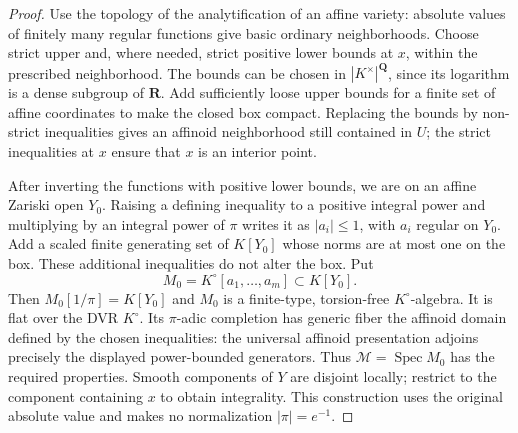 \documentclass[11pt,a4paper]{article}
\numberwithin{equation}{section}
\theoremstyle{definition}
\theoremstyle{remark}
\begin{document}
\begin{proof}
Use the topology of the analytification of an affine variety:
absolute values of finitely many regular functions give basic
ordinary neighborhoods. Choose strict upper and, where needed,
strict positive lower bounds at $x$, within the prescribed
neighborhood. The bounds can be chosen in
$|K^\times|^{\mathbf Q}$, since its logarithm is a dense
subgroup of $\mathbf R$. Add sufficiently loose upper bounds
for a finite set of affine coordinates to make the closed box
compact. Replacing the bounds by non-strict inequalities gives
an affinoid neighborhood still contained in $U$; the strict
inequalities at $x$ ensure that $x$ is an interior point.

After inverting the functions with positive lower bounds,
we are on an affine Zariski open $Y_0$. Raising a defining
inequality to a positive integral power and multiplying by
an integral power of $\pi$ writes it as $|a_i|\leq1$, with
$a_i$ regular on $Y_0$. Add a scaled finite generating set
of $K[Y_0]$ whose norms are at most one on the box. These
additional inequalities do not alter the box. Put
\[
             M_0=K^\circ[a_1,\ldots,a_m]\subset K[Y_0].
\]
Then $M_0[1/\pi]=K[Y_0]$ and $M_0$ is a finite-type,
torsion-free $K^\circ$-algebra. It is flat over the DVR
$K^\circ$. Its $\pi$-adic completion has generic fiber
the affinoid domain defined by the chosen inequalities:
the universal affinoid presentation adjoins precisely the
displayed power-bounded generators. Thus
$\mathcal M=\operatorname{Spec}M_0$ has the required properties.
Smooth components of $Y$ are disjoint locally; restrict to the
component containing $x$ to obtain integrality. This construction
uses the original absolute value and makes no normalization
$|\pi|=e^{-1}$.
\end{proof}
\end{document}
